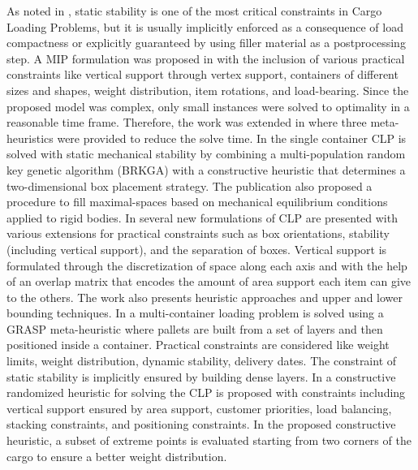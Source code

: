 As noted in \cite{BORTFELDT20131}, static stability is one of the most critical constraints in Cargo Loading Problems, but it is usually implicitly enforced as a consequence of load compactness or explicitly guaranteed by using filler material as a postprocessing step.
A MIP formulation was proposed in \cite{paquay2016mixed} with the inclusion of various practical constraints like vertical support through vertex support, containers of different sizes and shapes, weight distribution, item rotations, and load-bearing.
Since the proposed model was complex, only small instances were solved to optimality in a reasonable time frame. Therefore, the work was extended in \cite{paquay2007} where three meta-heuristics were provided to reduce the solve time.
In \cite{GALRAORAMOS2016565} the single container CLP is solved with static mechanical stability by combining a multi-population random key genetic algorithm (BRKGA) with a constructive heuristic that determines a two-dimensional box placement strategy.
The publication also proposed a procedure to fill maximal-spaces based on mechanical equilibrium conditions applied to rigid bodies.
In \cite{kurpel2020exact} several new formulations of CLP are presented with various extensions for practical constraints such as box orientations, stability (including vertical support), and the separation of boxes.
Vertical support is formulated through the discretization of space along each axis and with the help of an overlap matrix that encodes the amount of area support each item can give to the others.
The work also presents heuristic approaches and upper and lower bounding techniques.
In \cite{Alonso2020} a multi-container loading problem is solved using a GRASP meta-heuristic where pallets are built from a set of layers and then positioned inside a container. 
Practical constraints are considered like weight limits, weight distribution, dynamic stability, delivery dates. The constraint of static stability is implicitly ensured by building dense layers.
In \cite{GAJDA2022102559} a constructive randomized heuristic for solving the CLP is proposed with constraints including vertical support ensured by area support, customer priorities, load balancing, stacking constraints, and positioning constraints.
In the proposed constructive heuristic, a subset of extreme points is evaluated starting from two corners of the cargo to ensure a better weight distribution.

